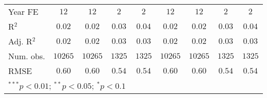 \begin{sidewaystable}
\begin{center}
\begin{tabular}{l c c c c c c c c}
Year FE              & $12$          & $12$          & $2$           & $2$           & $12$          & $12$          & $2$           & $2$           \\
R$^2$                & $0.02$        & $0.02$        & $0.03$        & $0.04$        & $0.02$        & $0.02$        & $0.03$        & $0.04$        \\
Adj. R$^2$           & $0.02$        & $0.02$        & $0.03$        & $0.03$        & $0.02$        & $0.02$        & $0.03$        & $0.03$        \\
Num. obs.            & $10265$       & $10265$       & $1325$        & $1325$        & $10265$       & $10265$       & $1325$        & $1325$        \\
RMSE                 & $0.60$        & $0.60$        & $0.54$        & $0.54$        & $0.60$        & $0.60$        & $0.54$        & $0.54$        \\
\bottomrule
\multicolumn{9}{l}{\scriptsize{$^{***}p<0.01$; $^{**}p<0.05$; $^{*}p<0.1$}}
\end{tabular}
\label{table_school_balance}
\end{center}
\end{sidewaystable}
